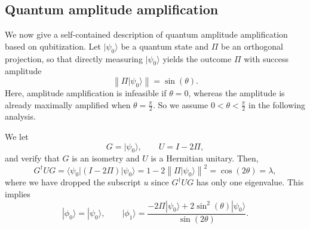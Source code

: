 \documentclass[letterpaper,onecolumn,11pt,accepted=2026-02-14]{quantumarticle}
\newcommand{\norm}[1]{\left\lVert#1\right\rVert}
\theoremstyle{remark}
\theoremstyle{plain}
\newcommand{\ket}[1]{|#1\rangle}
\newcommand{\bra}[1]{\langle#1|}
\begin{document}
\subsection{Quantum amplitude amplification}
\label{append:qubitization_amp}
We now give a self-contained description of quantum amplitude amplification based on qubitization.
Let $\ket{\psi_0}$ be a quantum state and $\Pi$ be an orthogonal projection, so that directly measuring $\ket{\psi_0}$ yields the outcome $\Pi$ with success amplitude
\begin{equation*}
    \norm{\Pi\ket{\psi_0}}=\sin(\theta).
\end{equation*}
Here, amplitude amplification is infeasible if $\theta=0$, whereas the amplitude is already maximally amplified when $\theta=\frac{\pi}{2}$. So we assume $0<\theta<\frac{\pi}{2}$ in the following analysis.

We let
\begin{equation*}
    G=\ket{\psi_0},\qquad
    U=I-2\Pi,
\end{equation*}
and verify that $G$ is an isometry and $U$ is a Hermitian unitary. Then,
\begin{equation*}
    G^\dagger UG=\bra{\psi_0}(I-2\Pi)\ket{\psi_0}=1-2\norm{\Pi\ket{\psi_0}}^2=\cos(2\theta)=\lambda,
\end{equation*}
where we have dropped the subscript $u$ since $G^\dagger UG$ has only one eigenvalue.
This implies
\begin{equation*}
    \ket{\phi_0}=\ket{\psi_0},\qquad
    \ket{\phi_1}=\frac{-2\Pi\ket{\psi_0}+2\sin^2(\theta)\ket{\psi_0}}{\sin(2\theta)}.
\end{equation*}
\end{document}
